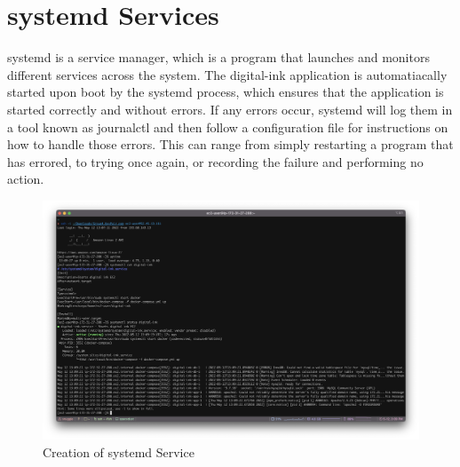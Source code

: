 \section{systemd Services}
systemd is a service manager, which is a program that launches and monitors different services across the system. The digital-ink application is automatiacally started upon boot by the systemd process, which ensures that the application is started correctly and without errors. If any errors occur, systemd will log them in a tool known as journalctl and then follow a configuration file for instructions on how to handle those errors. This can range from simply restarting a program that has errored, to trying once again, or recording the failure and performing no action.

\begin{figure}
    \centering
    \includegraphics[width=\textwidth]{resources/systemd/systemd.png}
    \caption{Creation of systemd Service}
    \label{fig:systemd}
\end{figure}
